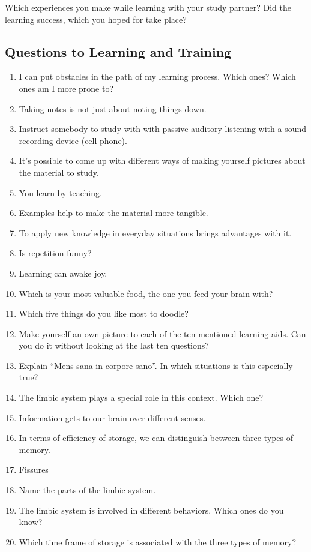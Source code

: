 \documentclass[../main.tex]{subfiles}
\begin{document}
Which experiences you make while learning with your study partner?
Did the learning success, which you hoped for take place?

\subsection{Questions to Learning and Training}
\begin{enumerate}
\item I can put obstacles in the path of my learning process. Which ones? Which ones am I more prone to?
\item Taking notes is not just about noting things down.
\item Instruct somebody to study with with passive auditory listening with a sound recording device (cell phone).
\item It's possible to come up with different ways of making yourself pictures about the material to study.
\item You learn by teaching.
\item Examples help to make the material more tangible.
\item To apply new knowledge in everyday situations brings advantages with it.
\item Is repetition funny?
\item Learning can awake joy.
\item Which is your most valuable food, the one you feed your brain with?
\item Which five things do you like most to doodle?
\item Make yourself an own picture to each of the ten mentioned learning aids.
  Can you do it without looking at the last ten questions?
\item Explain ``Mens sana in corpore sano''. In which situations is this especially true?
\item The limbic system plays a special role in this context. Which one?
\item Information gets to our brain over different senses.
\item In terms of efficiency of storage, we can distinguish between three types of memory.
\item Fissures
\item Name the parts of the limbic system.
\item The limbic system is involved in different behaviors. Which ones do you know?
\item Which time frame of storage is associated with the three types of memory?

\end{enumerate}
\end{document}

